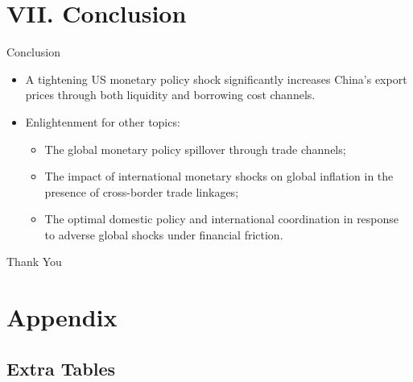 \documentclass[10pt]{beamer}
\begin{document}


\section{VII. Conclusion}

\begin{frame}{Conclusion}

\begin{itemize}

\item A tightening US monetary policy shock significantly increases China's export prices through both liquidity and borrowing cost channels.
\medskip
\item Enlightenment for other topics:
    \begin{itemize}
        \item The global monetary policy spillover through trade channels;
        \item The impact of international monetary shocks on global inflation in the presence of cross-border trade linkages;
        \item The optimal domestic policy and international coordination in response to adverse global shocks under financial friction.
    \end{itemize}
\end{itemize}

\end{frame}

\begin{frame}{}
  \centering \Huge
   Thank You
\end{frame}



\section*{Appendix}

\subsection{Extra Tables}
\end{document}
